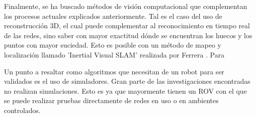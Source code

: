 Finalmente, se ha buscado métodos de visión computacional que complementan los procesos actuales explicados anteriormente. Tal es el caso del uso de reconstrucción 3D, el cual puede complementar al reconocimiento en tiempo real de las redes, sino saber con mayor exactitud dónde se encuentran los huecos y los puntos con mayor suciedad. Esto es posible con un método de mapeo y localización llamado 'Inertial Visual SLAM' realizada por Ferrera \cite{cite:Ferrera}. Para 


Un punto a resaltar como algoritmos que necesitan de un robot para ser validados es el uso de simuladores. Gran parte de las investigaciones encontradas no realizan simulaciones. Esto es ya que mayormente tienen un ROV con el que se puede realizar pruebas directamente de redes en uso o en ambientes controlados. 








%
